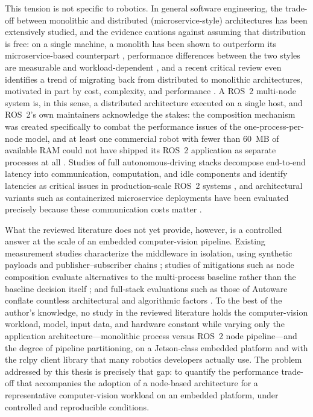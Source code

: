 This tension is not specific to robotics. In general software
engineering, the trade-off between monolithic and distributed
(microservice-style) architectures has been extensively studied, and the
evidence cautions against assuming that distribution is free: on a single
machine, a monolith has been shown to outperform its microservice-based
counterpart \cite{blinowski2022}, performance differences between the two
styles are measurable and workload-dependent \cite{tapia2020}, and a
recent critical review even identifies a trend of migrating back from
distributed to monolithic architectures, motivated in part by cost,
complexity, and performance \cite{felisberto2024}. A ROS~2 multi-node
system is, in this sense, a distributed architecture executed on a single
host, and ROS~2's own maintainers acknowledge the stakes: the composition
mechanism was created specifically to combat the performance issues of
the one-process-per-node model, and at least one commercial robot with
fewer than 60~MB of available RAM could not have shipped its ROS~2
application as separate processes at all \cite{macenski2023}. Studies of
full autonomous-driving stacks decompose end-to-end latency into
communication, computation, and idle components and identify latencies as
critical issues in production-scale ROS~2 systems \cite{betz2023a}, and
architectural variants such as containerized microservice deployments have
been evaluated precisely because these communication costs matter
\cite{betz2024}.

What the reviewed literature does not yet provide, however, is a
controlled answer at the scale of an embedded computer-vision pipeline.
Existing measurement studies characterize the middleware in isolation,
using synthetic payloads and publisher--subscriber chains
\cite{maruyama2016, kronauer2021, kamiya2025, luo2025, zhang2024}; studies
of mitigations such as node composition evaluate alternatives to the
multi-process baseline rather than the baseline decision itself
\cite{macenski2023}; and full-stack evaluations such as those of Autoware
conflate countless architectural and algorithmic factors
\cite{betz2023a, betz2024}. To the best of the author's knowledge, no
study in the reviewed literature holds the computer-vision workload,
model, input data, and hardware constant while varying only the
application architecture---monolithic process versus ROS~2 node
pipeline---and the degree of pipeline partitioning, on a Jetson-class
embedded platform and with the rclpy client library that many robotics
developers actually use.
The problem addressed by this thesis is precisely that gap: to quantify
the performance trade-off that accompanies the adoption of a node-based
architecture for a representative computer-vision workload on an embedded
platform, under controlled and reproducible conditions.

